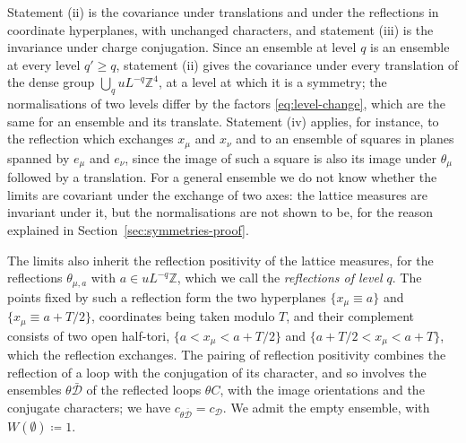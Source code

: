 \documentclass[11pt]{preprint}
\numberwithin{equation}{section}
\theoremstyle{definition}
\theoremstyle{remark}
\theoremstyle{plain}
\begin{document}
Statement (ii) is the covariance under translations and under the reflections in coordinate hyperplanes, with unchanged characters, and statement (iii) is the invariance under charge conjugation. Since an ensemble at level $q$ is an ensemble at every level $q' \geq q$, statement (ii) gives the covariance under every translation of the dense group $\bigcup_q uL^{-q}\mathbb Z^4$, at a level at which it is a symmetry; the normalisations of two levels differ by the factors \eqref{eq:level-change}, which are the same for an ensemble and its translate. Statement (iv) applies, for instance, to the reflection which exchanges $x_\mu$ and $x_\nu$ and to an ensemble of squares in planes spanned by $e_\mu$ and $e_\nu$, since the image of such a square is also its image under $\theta_\mu$ followed by a translation. For a general ensemble we do not know whether the limits are covariant under the exchange of two axes: the lattice measures are invariant under it, but the normalisations are not shown to be, for the reason explained in Section~\ref{sec:symmetries-proof}.

The limits also inherit the reflection positivity of the lattice measures, for the reflections $\theta_{\mu,a}$ with $a \in uL^{-q}\mathbb Z$, which we call the \emph{reflections of level $q$}. The points fixed by such a reflection form the two hyperplanes $\{ x_\mu \equiv a \}$ and $\{ x_\mu \equiv a + T/2 \}$, coordinates being taken modulo $T$, and their complement consists of two open half-tori, $\{ a < x_\mu < a + T/2 \}$ and $\{ a + T/2 < x_\mu < a + T \}$, which the reflection exchanges. The pairing of reflection positivity combines the reflection of a loop with the conjugation of its character, and so involves the ensembles $\theta\bar{\mathcal D}$ of the reflected loops $\theta C$, with the image orientations and the conjugate characters; we have $c_{\theta\bar{\mathcal D}} = c_{\mathcal D}$. We admit the empty ensemble, with $W(\emptyset) \coloneqq 1$.
\end{document}
